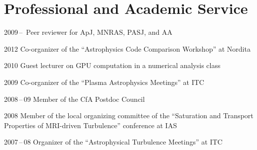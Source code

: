 \section*{Professional and Academic Service}

\begin{tlist}

\item[2009\,--\,] Peer reviewer for ApJ, MNRAS, PASJ, and AA

\item[2012] Co-organizer of the ``Astrophysics Code Comparison Workshop'' at Nordita

\item[2010] Guest lecturer on GPU computation in a numerical analysis class

\item[2009] Co-organizer of the ``Plasma Astrophysics Meetings'' at ITC

\item[2008\,--\,09] Member of the CfA Postdoc Council

\item[2008] Member of the local organizing committee of the ``Saturation and Transport Properties of MRI-driven Turbulence'' conference at IAS

\item[2007\,--\,08] Organizer of the ``Astrophysical Turbulence Meetings'' at ITC

\end{tlist}
